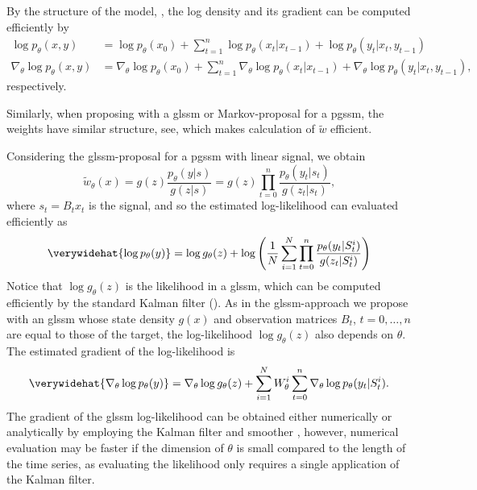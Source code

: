 

By the structure of the model, , the log density and its gradient can be computed efficiently by
\begin{align*}
    \log p_{\theta}(x,y) &= \log p_{\theta}(x_{0}) + \sum_{t = 1}^{n} \log p_{\theta}(x_{t}|x_{t-1}) + \log p_{\theta} (y_{t}|x_{t},y_{t - 1})\\
    \nabla_{\theta}\log p_{\theta}(x,y) &= \nabla_{\theta}\log p_{\theta}(x_{0}) + \sum_{t = 1}^{n} \nabla_{\theta}\log p_{\theta}(x_{t}|x_{t-1}) + \nabla_{\theta}\log p_{\theta} (y_{t}|x_{t},y_{t - 1}),
\end{align*}
respectively. 

Similarly, when proposing with a \acrshort{glssm} or Markov-proposal for a \acrshort{pgssm}, the weights have similar structure, see, which makes calculation of $\tilde w$ efficient. 

Considering the \acrshort{glssm}-proposal for a \acrshort{pgssm} with linear signal, we obtain 
$$
    \tilde w_{\theta}(x) = g(z)\frac{p_{\theta}(y|s)}{g(z|s)} = g(z) \prod_{t = 0}^n \frac{p_{\theta}(y_{t}|s_{t})}{g(z_{t}|s_{t})},
$$
where $s_{t} = B_{t}x_{t}$ is the signal, and so the estimated log-likelihood can evaluated efficiently as 
\begin{align}
    \label{eq:loglik-hat-linearsignal}
    \verywidehat{\log p_{\theta}(y)} = \log g_{\theta}(z) + \log \left(\frac{1}{N}\sum_{i=1}^{N}\prod_{t = 0}^{n} \frac{p_{\theta}(y_{t}|S^{i}_{t})}{ g(z_{t}|S^{i}_{t})}\right)
\end{align}
Notice that $\log g_{\theta}(z)$ is the likelihood in a \acrshort{glssm}, which can be computed efficiently by the standard Kalman filter (). As in the \acrshort{glssm}-approach we propose with an \acrshort{glssm} whose state density $g(x)$ and observation matrices $B_{t}$, $t = 0, \dots, n$ are equal to those of the target, the log-likelihood $\log g_{\theta}(z)$ also depends on $\theta$. The estimated gradient of the log-likelihood is 
$$
    \verywidehat{\nabla_{\theta} \log p_{\theta}(y)} = \nabla_{\theta} \log g_{\theta}(z) + \sum_{i=1}^N W^{i}_\theta \sum_{t = 0}^n \nabla_{\theta} \log p_{\theta}(y_{t}|S_{t}^{i}).
$$
The gradient of the \acrshort{glssm} log-likelihood can be obtained either numerically or analytically by employing the Kalman filter and smoother \citep{Koopman1992Exact}, however, numerical evaluation may be faster if the dimension of $\theta$ is small compared to the length of the time series, as evaluating the likelihood only requires a single application of the Kalman filter. 

